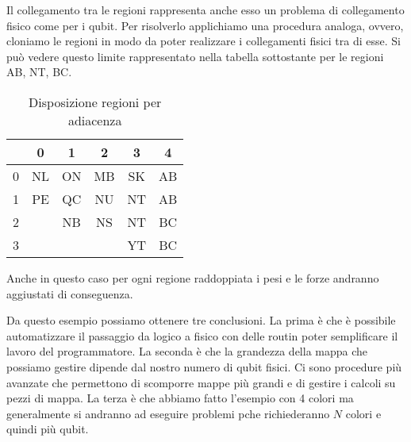 Il collegamento tra le regioni rappresenta anche esso un problema di collegamento fisico come per i qubit. Per risolverlo applichiamo una procedura analoga, ovvero, cloniamo le regioni in modo da poter realizzare i collegamenti fisici tra di esse. Si può vedere questo limite rappresentato nella tabella sottostante per le regioni AB, NT, BC.
\begin{table}[h]
  \begin{center}
    \begin{tabular}{ l | c | c | c | c | c }
        & 0  & 1  & 2  & 3  & 4  \\ \hline
      0 & NL & ON & MB & SK & AB \\
      1 & PE & QC & NU & NT & AB \\
      2 &    & NB & NS & NT & BC \\
      3 &    &    &    & YT & BC \\
    \end{tabular}
    \caption{Disposizione regioni per adiacenza}
  \end{center}
\end{table}
Anche in questo caso per ogni regione raddoppiata i pesi e le forze andranno aggiustati di conseguenza.

Da questo esempio possiamo ottenere tre conclusioni. La prima è che è possibile automatizzare il passaggio da logico a fisico con delle routin poter semplificare il lavoro del programmatore. La seconda è che la grandezza della mappa che possiamo gestire dipende dal nostro numero di qubit fisici. Ci sono procedure più avanzate che permettono di scomporre mappe più grandi e di gestire i calcoli su pezzi di mappa. La terza è che abbiamo fatto l'esempio con 4 colori ma generalmente si andranno ad eseguire problemi pche richiederanno $N$ colori e quindi più qubit.

